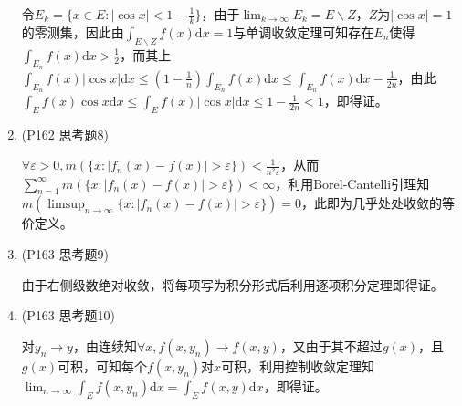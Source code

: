 \documentclass[a4paper,UTF8,fontset=windows]{ctexart}
\begin{document}
\begin{enumerate}
    令$E_k=\{x\in E:|\cos x|<1-\frac{1}{k}\}$，由于$\lim_{k\to\infty}E_k=E\backslash Z$，$Z$为$|\cos x|=1$的零测集，因此由$\int_{E\backslash Z}f(x)\mathrm{d}x=1$与单调收敛定理可知存在$E_n$使得$\int_{E_n}f(x)\mathrm{d}x>\frac{1}{2}$，而其上$\int_{E_n}f(x)|\cos x|\mathrm{d}x\le(1-\frac{1}{n})\int_{E_n}f(x)\mathrm{d}x\le\int_{E_n}f(x)\mathrm{d}x-\frac{1}{2n}$，由此$\int_Ef(x)\cos{x}\mathrm{d}x\le\int_Ef(x)|\cos x|\mathrm{d}x\le1-\frac{1}{2n}<1$，即得证。
    
    \item (P162 思考题8)
    
    $\forall\varepsilon>0,m(\{x:|f_n(x)-f(x)|>\varepsilon\})<\frac{1}{n^2\varepsilon}$，从而$\sum_{n=1}^\infty m(\{x:|f_n(x)-f(x)|>\varepsilon\})<\infty$，利用Borel-Cantelli引理知$m(\limsup_{n\to\infty}\{x:|f_n(x)-f(x)|>\varepsilon\})=0$，此即为几乎处处收敛的等价定义。
    
    \item (P163 思考题9)
    
    由于右侧级数绝对收敛，将每项写为积分形式后利用逐项积分定理即得证。
    
    \item (P163 思考题10)
    
    对$y_n\to y$，由连续知$\forall x,f(x,y_n)\to f(x,y)$，又由于其不超过$g(x)$，且$g(x)$可积，可知每个$f(x,y_n)$对$x$可积，利用控制收敛定理知$\lim_{n\to\infty}\int_Ef(x,y_n)\mathrm{d}x=\int_Ef(x,y)\mathrm{d}x$，即得证。
\end{enumerate}
\end{document}
